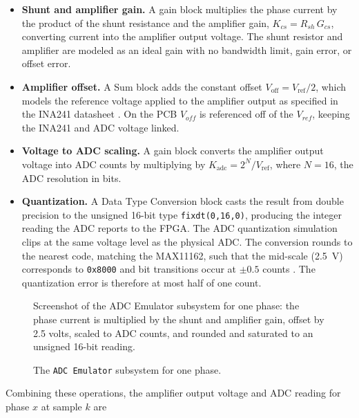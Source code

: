 \begin{itemize}
	\item \textbf{Shunt and amplifier gain.} A gain block multiplies the phase current by the product of the shunt resistance and the amplifier gain, $K_{cs} = R_{sh}\,G_{cs}$, converting current into the amplifier output voltage. The shunt resistor and amplifier are modeled as an ideal gain with no bandwidth limit, gain error, or offset error.
	
	\item \textbf{Amplifier offset.} A Sum block adds the constant offset $V_{\mathrm{off}} = V_{\mathrm{ref}}/2$, which models the reference voltage applied to the amplifier output as specified in the INA241 datasheet \cite{ti_ina241_2023}. On the PCB $V_{off}$ is referenced off of the $V_{ref}$, keeping the INA241 and ADC voltage linked. 
	
	\item \textbf{Voltage to ADC scaling.} A gain block converts the amplifier output voltage into ADC counts by multiplying by $K_{\mathrm{adc}} = 2^{N}/V_{\mathrm{ref}}$, where $N = 16$, the ADC resolution in bits.
	
	\item \textbf{Quantization.} A Data Type Conversion block casts the result from double precision to the unsigned 16-bit type \texttt{fixdt(0,16,0)}, producing the integer reading the ADC reports to the FPGA. The ADC quantization simulation clips at the same voltage level as the physical ADC. The conversion rounds to the nearest code, matching the MAX11162, such that the mid-scale (\SI{2.5}{\volt}) corresponds to \texttt{0x8000} and bit transitions occur at $\pm0.5$ counts \cite{adi_max11162_2017}. The quantization error is therefore at most half of one count. 
\end{itemize}

\begin{figure}[htbp]
	\centering
		{Screenshot of the ADC Emulator subsystem for one phase: the phase current is multiplied by the shunt and amplifier gain, offset by 2.5 volts, scaled to ADC counts, and rounded and saturated to an unsigned 16-bit reading.}
	\caption[The ADC Emulator subsystem]{The \texttt{ADC Emulator} subsystem for one phase.}
	\label{fig:adc_emulator}
\end{figure}
Combining these operations, the amplifier output voltage and ADC reading for phase $x$ at sample $k$ are

